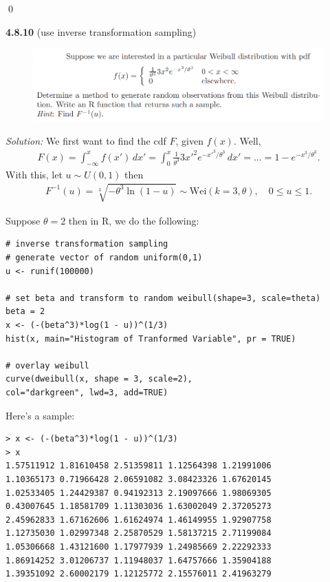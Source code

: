 \documentclass{book}
\theoremstyle{definition}
\newcommand{\f}[2]{\frac{#1}{#2}}
\begin{document}
\qed
















\newpage
\noindent\textbf{4.8.10} (use inverse transformation sampling)
\begin{figure}[!htb]
	\centering
	\includegraphics[scale=0.5]{4810}
\end{figure}



\noindent \textit{Solution:}  We first want to find the cdf $F$, given $f(x)$. Well, 
\begin{align}
F(x) = \int^x_{-\infty} f(x')\,dx' = \int^x_0 \f{1}{\theta^3}3x'^2 e^{-x'^3/\theta^3}\,dx' = \dots = 1 - e^{-x^3/\theta^3}.
\end{align}
With this, let $u \sim U(0,1)$ then 
\begin{align}
F^{-1}(u) = \sqrt[3]{-\theta^3\ln(1-u)} \sim \text{Wei}(k=3, \theta), \quad 0 \leq u \leq 1.
\end{align} 

Suppose $\theta = 2$ then in R, we do the following:
\begin{lstlisting}
# inverse transformation sampling
# generate vector of random uniform(0,1)
u <- runif(100000)

# set beta and transform to random weibull(shape=3, scale=theta)
beta = 2
x <- (-(beta^3)*log(1 - u))^(1/3)
hist(x, main="Histogram of Tranformed Variable", pr = TRUE)

# overlay weibull
curve(dweibull(x, shape = 3, scale=2), 
col="darkgreen", lwd=3, add=TRUE)
\end{lstlisting}

Here's a sample:
\begin{lstlisting}
> x <- (-(beta^3)*log(1 - u))^(1/3)
> x
1.57511912 1.81610458 2.51359811 1.12564398 1.21991006
1.10365173 0.71966428 2.06591082 3.08423326 1.67620145
1.02533405 1.24429387 0.94192313 2.19097666 1.98069305
0.43007645 1.18581709 1.11303036 1.63002049 2.37205273
2.45962833 1.67162606 1.61624974 1.46149955 1.92907758
1.12735030 1.02997348 2.25870529 1.58137215 2.71199084
1.05306668 1.43121600 1.17977939 1.24985669 2.22292333
1.86914252 3.01206737 1.11948037 1.64757666 1.35904188
1.39351092 2.60002179 1.12125772 2.15576011 2.41963279
\end{lstlisting}
\end{document}

